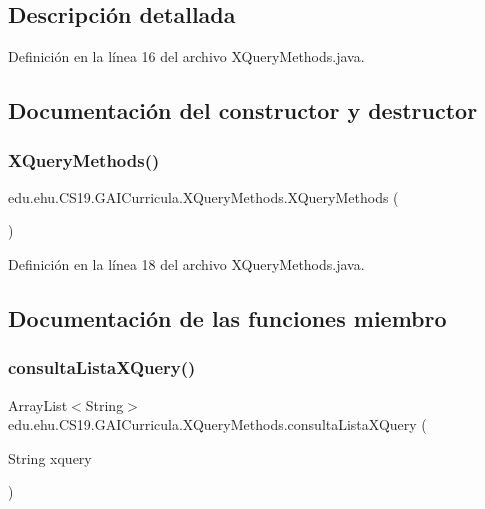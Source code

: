 \subsection{Descripción detallada}


Definición en la línea 16 del archivo X\+Query\+Methods.\+java.



\subsection{Documentación del constructor y destructor}
\mbox{\label{classedu_1_1ehu_1_1_c_s19_1_1_g_a_i_curricula_1_1_x_query_methods_ade5a845ccb94c1feb5420a2550243985}} 
\subsubsection{\texorpdfstring{XQueryMethods()}{XQueryMethods()}}
{\footnotesize\ttfamily edu.\+ehu.\+C\+S19.\+G\+A\+I\+Curricula.\+X\+Query\+Methods.\+X\+Query\+Methods (\begin{DoxyParamCaption}{ }\end{DoxyParamCaption})}



Definición en la línea 18 del archivo X\+Query\+Methods.\+java.



\subsection{Documentación de las funciones miembro}
\mbox{\label{classedu_1_1ehu_1_1_c_s19_1_1_g_a_i_curricula_1_1_x_query_methods_a8b0ac4baf3bbd3829073a87325dd714d}} 
\subsubsection{\texorpdfstring{consultaListaXQuery()}{consultaListaXQuery()}}
{\footnotesize\ttfamily Array\+List$<$String$>$ edu.\+ehu.\+C\+S19.\+G\+A\+I\+Curricula.\+X\+Query\+Methods.\+consulta\+Lista\+X\+Query (\begin{DoxyParamCaption}\item[{String}]{xquery }\end{DoxyParamCaption})}



